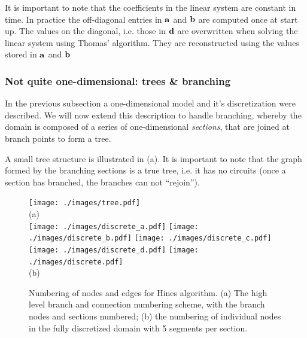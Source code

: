 It is important to note that the coefficients in the linear system are constant in time. In practice the off-diagonal entries in $\mathbf{a}$ and $\mathbf{b}$ are computed once at start up. The values on the diagonal, i.e. those in $\mathbf{d}$ are overwritten when solving the linear system using Thomas' algorithm. They are reconstructed using the values stored in $\mathbf{a}$ and $\mathbf{b}$
\subsubsection{Not quite one-dimensional: trees \& branching}
In the previous subsection a one-dimensional model and it's discretization were described. We will now extend this description to handle branching, whereby the domain is composed of a series of one-dimensional \emph{sections}, that are joined at branch points to form a tree. 

A small tree structure is illustrated in (a). It is important to note that the graph formed by the branching sections is a true tree, i.e. it has no circuits (once a section has branched, the branches can not ``rejoin'').

\begin{figure}[htp!]
\centering
\texttt{[image: ./images/tree.pdf]}
\\{\normalsize (a)}\\
\texttt{[image: ./images/discrete\_a.pdf]}
\texttt{[image: ./images/discrete\_b.pdf]}
\texttt{[image: ./images/discrete\_c.pdf]}
\texttt{[image: ./images/discrete\_d.pdf]}
\texttt{[image: ./images/discrete.pdf]}
\\{\normalsize (b)}
\caption{Numbering of nodes and edges for Hines algorithm. (a) The high level branch and connection numbering scheme, with the branch nodes and sections numbered; (b) the numbering of individual nodes in the fully discretized domain with 5 segments per section.}
\label{fig:tree}
\end{figure}

